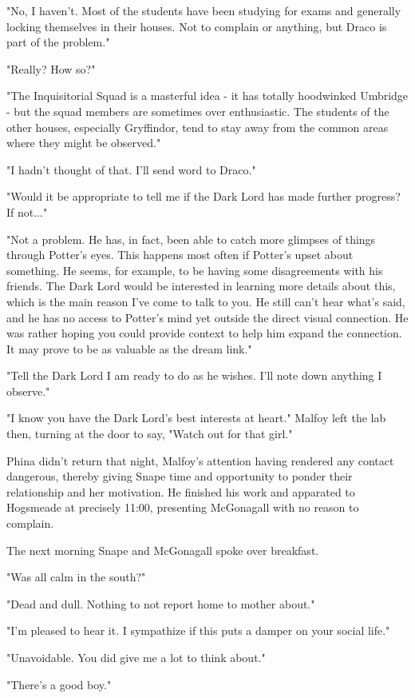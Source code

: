 "No, I haven't. Most of the students have been studying for exams and generally locking themselves in their houses. Not to complain or anything, but Draco is part of the problem."

"Really? How so?"

"The Inquisitorial Squad is a masterful idea - it has totally hoodwinked Umbridge - but the squad members are sometimes over enthusiastic. The students of the other houses, especially Gryffindor, tend to stay away from the common areas where they might be observed."

"I hadn't thought of that. I'll send word to Draco."

"Would it be appropriate to tell me if the Dark Lord has made further progress? If not..."

"Not a problem. He has, in fact, been able to catch more glimpses of things through Potter's eyes. This happens most often if Potter's upset about something. He seems, for example, to be having some disagreements with his friends. The Dark Lord would be interested in learning more details about this, which is the main reason I've come to talk to you. He still can't hear what's said, and he has no access to Potter's mind yet outside the direct visual connection. He was rather hoping you could provide context to help him expand the connection. It may prove to be as valuable as the dream link."

"Tell the Dark Lord I am ready to do as he wishes. I'll note down anything I observe."

"I know you have the Dark Lord's best interests at heart." Malfoy left the lab then, turning at the door to say, "Watch out for that girl."

Phina didn't return that night, Malfoy's attention having rendered any contact dangerous, thereby giving Snape time and opportunity to ponder their relationship and her motivation. He finished his work and apparated to Hogsmeade at precisely 11:00, presenting McGonagall with no reason to complain.

The next morning Snape and McGonagall spoke over breakfast.

"Was all calm in the south?"

"Dead and dull. Nothing to not report home to mother about."

"I'm pleased to hear it. I sympathize if this puts a damper on your social life."

"Unavoidable. You did give me a lot to think about."

"There's a good boy."

